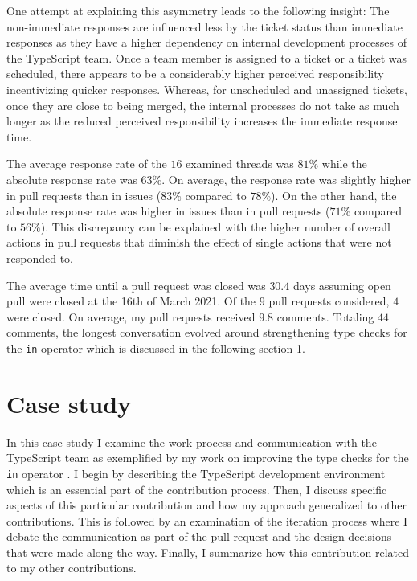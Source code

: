 \documentclass[12pt]{scrartcl}
\def\code#1{\texttt{\frenchspacing#1}}
\begin{document}
One attempt at explaining this asymmetry leads to the following insight: The non-immediate responses are influenced less by the ticket status than immediate responses as they have a higher dependency on internal development processes of the TypeScript team. Once a team member is assigned to a ticket or a ticket was scheduled, there appears to be a considerably higher perceived responsibility incentivizing quicker responses. Whereas, for unscheduled and unassigned tickets, once they are close to being merged, the internal processes do not take as much longer as the reduced perceived responsibility increases the immediate response time.

The average response rate of the $16$ examined threads was $81\%$ while the absolute response rate was $63\%$. On average, the response rate was slightly higher in pull requests than in issues ($83\%$ compared to $78\%$). On the other hand, the absolute response rate was higher in issues than in pull requests ($71\%$ compared to $56\%$). This discrepancy can be explained with the higher number of overall actions in pull requests that diminish the effect of single actions that were not responded to.

The average time until a pull request was closed was $30.4$ days assuming open pull were closed at the 16th of March 2021. Of the $9$ pull requests considered, $4$ were closed. On average, my pull requests received $9.8$ comments. Totaling $44$ comments, the longest conversation evolved around strengthening type checks for the \code{in} operator \cite{41317} which is discussed in the following section \ref{case_study}.

\section{Case study}
\label{case_study}

In this case study I examine the work process and communication with the TypeScript team as exemplified by my work on improving the type checks for the \code{in} operator \cite{41317}. I begin by describing the TypeScript development environment which is an essential part of the contribution process. Then, I discuss specific aspects of this particular contribution and how my approach generalized to other contributions. This is followed by an examination of the iteration process where I debate the communication as part of the pull request and the design decisions that were made along the way. Finally, I summarize how this contribution related to my other contributions.
\end{document}
